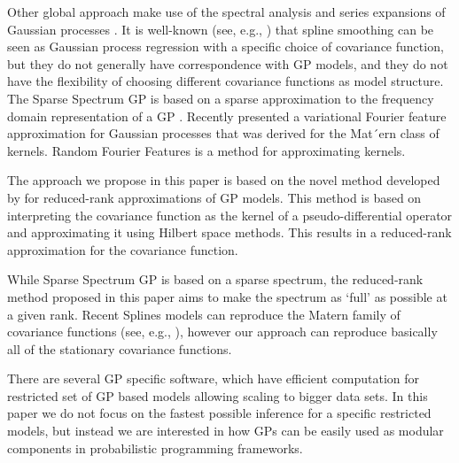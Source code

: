 \documentclass[]{interact}
\theoremstyle{plain}%
\theoremstyle{definition}
\theoremstyle{remark}
\begin{document}
Other global approach make use of the spectral analysis and series expansions of Gaussian processes \citep{loeve1977probability,trees1968detection,adler1981geometry,cramer2013stationary}. It is well-known (see, e.g., \cite{wahba1990spline}) that spline smoothing can be seen as Gaussian process regression with a specific choice of covariance function, but they do not generally have correspondence with GP models, and they do not have the flexibility of choosing different covariance functions as model structure. The Sparse Spectrum GP is based on a sparse approximation to the frequency domain representation of a GP \citep{lazaro2010sparse,quia2010sparse,gal2015improving,gal2015improving}. Recently \citep{hensman2017variational} presented a variational Fourier feature approximation for Gaussian processes that was derived for the Mat´ern class of kernels. Random Fourier Features \citep{rahimi2008random,rahimi2009weighted} is a method for approximating kernels.

The approach we propose in this paper is based on the novel method developed by \cite{solin2018hilbert} for reduced-rank approximations of GP models. This method is based on interpreting the covariance function as the kernel of a pseudo-differential operator and approximating it using Hilbert space methods. This results in a reduced-rank approximation for the covariance function. 

While Sparse Spectrum GP is based on a sparse spectrum, the reduced-rank method proposed in this paper aims to make the spectrum as ‘full’ as possible at a given rank.
Recent Splines models can reproduce the Matern family of covariance functions (see, e.g., \cite{wood2003thin}), however our approach can reproduce basically all of the stationary covariance functions. 

There are several GP specific software, which have efficient
computation for restricted set of GP based models allowing scaling to
bigger data sets. In this paper we do not focus on the fastest
possible inference for a specific restricted models, but instead we
are interested in how GPs can be easily used as modular components in
probabilistic programming frameworks.
\end{document}
